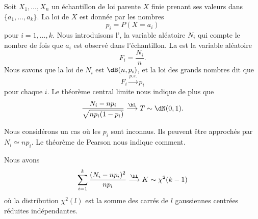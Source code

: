 Soit \( X_1,\ldots,X_n\) un échantillon de loi parente $X$ finie prenant ses valeurs dans \( \{ a_1,\ldots, a_k \}\). La loi de \( X\) est donnée par les nombres
\begin{equation}
    p_i=P(X=a_i)
\end{equation}
pour \( i=1,\ldots, k\). Nous introduisons l', la variable aléatoire \( N_i\) qui compte le nombre de fois que \( a_i\) est observé dans l'échantillon. La  est la variable aléatoire
\begin{equation}
    F_i=\frac{ N_i }{ n }.
\end{equation}
Nous savons que la loi de \( N_i\) est \( \dB(n,p_i)\), et la loi des grands nombres dit que
\begin{equation}
    F_i\stackrel{p.s.}{\longrightarrow}p_i
\end{equation}
pour chaque \( i\). Le théorème central limite nous indique de plus que
\begin{equation}
    \frac{ N_i-np_i }{ \sqrt{np_i(1-p_i)} }\stackrel{\hL}{\longrightarrow} T\sim\dN(0,1).
\end{equation}

Nous considérons un cas où les \( p_i\) sont inconnus. Ils peuvent être approchés par \( N_i\simeq np_i\). Le théorème de Pearson nous indique comment.
\begin{theorem}
    Nous avons
    \begin{equation}
        \sum_{i=1}^k\frac{ (N_i-np_i)^2 }{ np_i }\stackrel{\hL}{\longrightarrow}K\sim\chi^2(k-1)
    \end{equation}
    où la distribution \( \chi^2(l)\) est la somme des carrés de \( l\) gaussiennes centrées réduites indépendantes.
\end{theorem}

